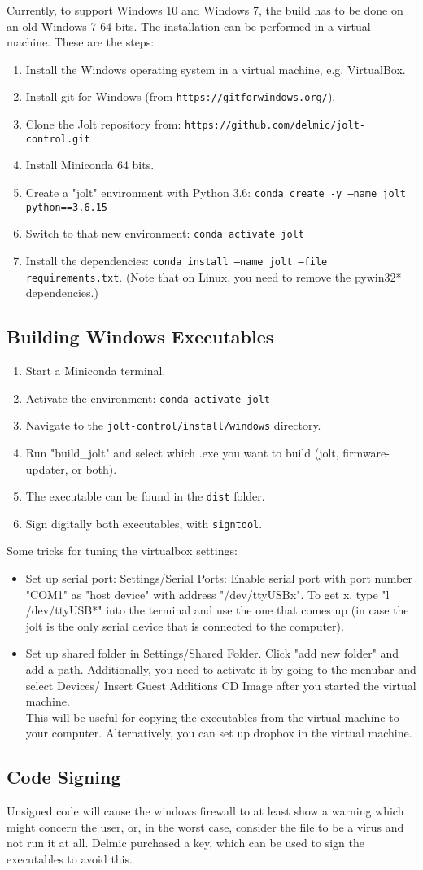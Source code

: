 \documentclass[]{article}
\begin{document}
Currently, to support Windows 10 and Windows 7, the build has to be done on an old Windows 7 64 bits.
The installation can be performed in a virtual machine.
These are the steps:
\begin{enumerate}
	\item Install the Windows operating system in a virtual machine, e.g. VirtualBox.
	\item Install git for Windows (from \texttt{https://gitforwindows.org/}).
	\item Clone the Jolt repository from: \texttt{https://github.com/delmic/jolt-control.git}
	\item Install Miniconda 64 bits.
	\item Create a "jolt" environment with Python 3.6: \texttt{conda create -y --name jolt python==3.6.15}
	\item Switch to that new environment: \texttt{conda activate jolt}
	\item Install the dependencies: \texttt{conda install --name jolt --file requirements.txt}. (Note that on Linux, you need to remove the pywin32* dependencies.)
\end{enumerate}

\subsection{Building Windows Executables}
\begin{enumerate}
	\item Start a Miniconda terminal.
	\item Activate the environment: \texttt{conda activate jolt}
	\item Navigate to the \texttt{jolt-control/install/windows} directory.
	\item Run "build\_jolt" and select which .exe you want to build (jolt, firmware-updater, or both).
	\item The executable can be found in the \texttt{dist} folder.
	\item Sign digitally both executables, with \texttt{signtool}.
\end{enumerate}

Some tricks for tuning the virtualbox settings:
\begin{itemize}
	\item Set up serial port: Settings/Serial Ports: Enable serial port with port number "COM1" as "host device" with address "/dev/ttyUSBx". To get x, type "l /dev/ttyUSB*" into the terminal and use the one that comes up (in case the jolt is the only serial device that is connected to the computer).
	\item Set up shared folder in Settings/Shared Folder. Click "add new folder" and add a path. Additionally, you need to activate it by going to the menubar and select Devices/ Insert Guest Additions CD Image after you started the virtual machine.\\
	This will be useful for copying the executables from the virtual machine to your computer. Alternatively, you can set up dropbox in the virtual machine.
\end{itemize}

\subsection{Code Signing}
Unsigned code will cause the windows firewall to at least show a warning which might concern the user, or, in the worst case, consider the file to be a virus and not run it at all. Delmic purchased a key, which can be used to sign the executables to avoid this.
\end{document}
